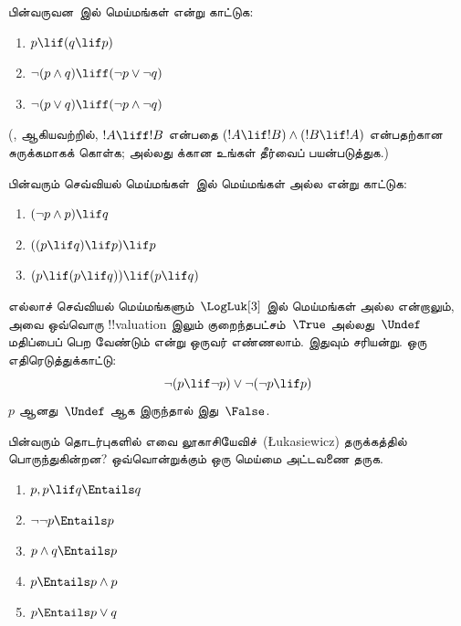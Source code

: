 \documentclass[../../../include/open-logic-section]{subfiles}
\begin{document}
\begin{prob}
  பின்வருவன~\LogLuk[3] இல் மெய்மங்கள் என்று காட்டுக:
  \begin{enumerate}
    \item $p \lif (q \lif p)$
    \item\label{mvl:thr:luk:prob:luk-taut-2} $\lnot(p \land q) \liff (\lnot p \lor \lnot q)$
    \item\label{mvl:thr:luk:prob:luk-taut-3} $\lnot(p \lor q) \liff (\lnot p \land \lnot q)$
  \end{enumerate}
  (,
   ஆகியவற்றில்,
  $!A \liff !B$ என்பதை $(!A \lif !B) \land (!B \lif !A)$ என்பதற்கான
  சுருக்கமாகக் கொள்க; அல்லது  க்கான
  உங்கள் தீர்வைப் பயன்படுத்துக.)
\end{prob}

\begin{prob}
  பின்வரும் செவ்வியல் மெய்மங்கள்~\LogLuk[3] இல் மெய்மங்கள் அல்ல என்று
  காட்டுக:
  \begin{enumerate}
    \item $(\lnot p \land p) \lif q$
    \item $((p \lif q) \lif p) \lif p$
    \item $(p \lif (p \lif q)) \lif (p \lif q)$
  \end{enumerate}
\end{prob}

எல்லாச் செவ்வியல் மெய்மங்களும்~$\LogLuk[3]$ இல் மெய்மங்கள் அல்ல என்றாலும்,
அவை ஒவ்வொரு !!{valuation} இலும் குறைந்தபட்சம்~$\True$ அல்லது~$\Undef$
மதிப்பைப் பெற வேண்டும் என்று ஒருவர் எண்ணலாம். இதுவும் சரியன்று. ஒரு
எதிரெடுத்துக்காட்டு:
\[
  \lnot(p \lif \lnot p) \lor \lnot(\lnot p \lif p)
\]
$p$ ஆனது~$\Undef$ ஆக இருந்தால் இது~$\False$.

\begin{prob}
  பின்வரும் தொடர்புகளில் எவை லூகாசியேவிச்~(\L ukasiewicz) தருக்கத்தில்
  பொருந்துகின்றன?
  ஒவ்வொன்றுக்கும் ஒரு மெய்மை அட்டவணை தருக.
  \begin{enumerate}
    \item $p, p \lif q \Entails q$
    \item $\lnot\lnot p \Entails p$
    \item $p \land q \Entails p$
    \item $p \Entails p \land p$
    \item $p \Entails p \lor q$
  \end{enumerate}
\end{prob}
\end{document}
